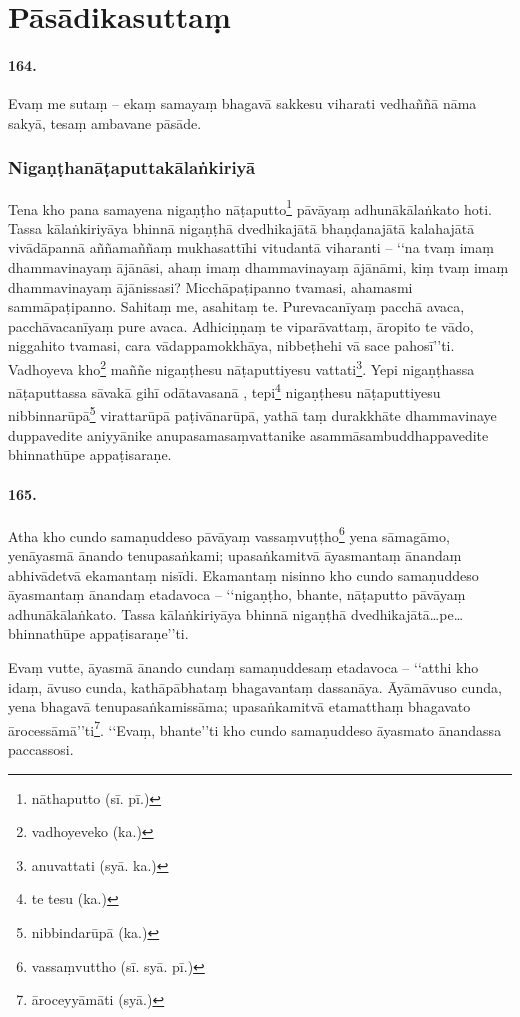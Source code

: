 \section{Pāsādikasuttaṃ}

\paragraph{164.} Evaṃ me sutaṃ – ekaṃ samayaṃ bhagavā sakkesu viharati vedhaññā nāma sakyā, tesaṃ ambavane pāsāde.

\subsubsection{Nigaṇṭhanāṭaputtakālaṅkiriyā}

Tena kho pana samayena nigaṇṭho nāṭaputto\footnote{nāthaputto (sī. pī.)} pāvāyaṃ adhunākālaṅkato hoti. Tassa kālaṅkiriyāya bhinnā nigaṇṭhā dvedhikajātā bhaṇḍanajātā kalahajātā vivādāpannā aññamaññaṃ mukhasattīhi vitudantā viharanti – ‘‘na tvaṃ imaṃ dhammavinayaṃ ājānāsi, ahaṃ imaṃ dhammavinayaṃ ājānāmi, kiṃ tvaṃ imaṃ dhammavinayaṃ ājānissasi? Micchāpaṭipanno tvamasi, ahamasmi sammāpaṭipanno. Sahitaṃ me, asahitaṃ te. Purevacanīyaṃ pacchā avaca, pacchāvacanīyaṃ pure avaca. Adhiciṇṇaṃ te viparāvattaṃ, āropito te vādo, niggahito tvamasi, cara vādappamokkhāya, nibbeṭhehi vā sace pahosī’’ti. Vadhoyeva kho\footnote{vadhoyeveko (ka.)} maññe nigaṇṭhesu nāṭaputtiyesu vattati\footnote{anuvattati (syā. ka.)}. Yepi nigaṇṭhassa nāṭaputtassa sāvakā gihī odātavasanā , tepi\footnote{te tesu (ka.)} nigaṇṭhesu nāṭaputtiyesu nibbinnarūpā\footnote{nibbindarūpā (ka.)} virattarūpā paṭivānarūpā, yathā taṃ durakkhāte dhammavinaye duppavedite aniyyānike anupasamasaṃvattanike asammāsambuddhappavedite bhinnathūpe appaṭisaraṇe.

\paragraph{165.} Atha kho cundo samaṇuddeso pāvāyaṃ vassaṃvuṭṭho\footnote{vassaṃvuttho (sī. syā. pī.)} yena sāmagāmo, yenāyasmā ānando tenupasaṅkami; upasaṅkamitvā āyasmantaṃ ānandaṃ abhivādetvā ekamantaṃ nisīdi. Ekamantaṃ nisinno kho cundo samaṇuddeso āyasmantaṃ ānandaṃ etadavoca – ‘‘nigaṇṭho, bhante, nāṭaputto pāvāyaṃ adhunākālaṅkato. Tassa kālaṅkiriyāya bhinnā nigaṇṭhā dvedhikajātā…pe… bhinnathūpe appaṭisaraṇe’’ti.

Evaṃ vutte, āyasmā ānando cundaṃ samaṇuddesaṃ etadavoca – ‘‘atthi kho idaṃ, āvuso cunda, kathāpābhataṃ bhagavantaṃ dassanāya. Āyāmāvuso cunda, yena bhagavā tenupasaṅkamissāma; upasaṅkamitvā etamatthaṃ bhagavato ārocessāmā’’ti\footnote{āroceyyāmāti (syā.)}. ‘‘Evaṃ, bhante’’ti kho cundo samaṇuddeso āyasmato ānandassa paccassosi.

